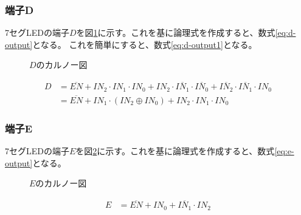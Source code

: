 \documentclass[a4paper,11pt,dvipdfmx]{jsarticle}
\begin{document}
\subsubsection{端子D}
7セグLEDの端子$D$を図\ref{fig:karnoD}に示す。これを基に論理式を作成すると、数式\eqref{eq:d-output}となる。
これを簡単にすると、数式\eqref{eq:d-output1}となる。\\
\begin{figure}[H]
    \centering
    \caption{\(D\)のカルノー図}
    \label{fig:karnoD}
\end{figure}

\begin{align}
  D &= \overline{EN} + IN_2 \cdot IN_1 \cdot IN_0 + IN_2 \cdot \overline{IN_1} \cdot \overline{IN_0} + \overline{IN_2} \cdot \overline{IN_1} \cdot IN_0\label{eq:d-output}\\
  &= \overline{EN} + IN_1 \cdot (IN_2 \oplus IN_0) + IN_2 \cdot IN_1 \cdot IN_0\label{eq:d-output1}
\end{align}

\subsubsection{端子E}
7セグLEDの端子$E$を図\ref{fig:karnoE}に示す。これを基に論理式を作成すると、数式\eqref{eq:e-output}となる。\\
\begin{figure}[H]
  \centering
    \caption{\(E\)のカルノー図}
    \label{fig:karnoE}
\end{figure}

\begin{align}
  E &= \overline{EN} + IN_0 + \overline{IN_1} \cdotp IN_2\label{eq:e-output}
\end{align}
\end{document}
